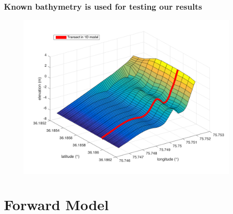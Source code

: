 \documentclass[7pt]{beamer}
\begin{document}
\begin{frame}
	\frametitle{Known bathymetry is used for testing our results}
			\begin{figure}[H]
	 			\includegraphics[width=1\linewidth]{img/trueBath2D.png}
	 		\end{figure}
\end{frame}

\section{Forward Model}
\end{document}
